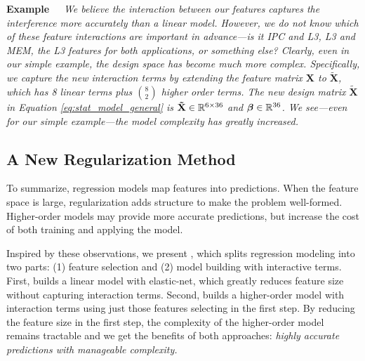 \noindent \textbf{Example~~}\textit{ We believe the interaction
  between our features captures the interference more accurately than
  a linear model.  However, we do not know which of these feature
  interactions are important in advance---\eg is it IPC and L3, L3 and
  MEM, the L3 features for both applications, or something else?
  Clearly, even in our simple example, the design space has become
  much more complex.  Specifically, we capture the new interaction
  terms by extending the feature matrix $\mathbf{X}$ to
  $\mathbf{\tilde{X}}$, which has 8 linear terms plus ${8 \choose 2}$
  higher order terms. The new design matrix $\mathbf{\tilde{X}}$ in
  Equation \eqref{eq:stat_model_general} is $\mathbf{\tilde{X}} \in
  \mathbb{R}^{6 \times 36}$ and $\boldsymbol{\beta} \in \mathbb{R}^{36}$. We
  see---even for our simple example---the model complexity has greatly
  increased.  }


\subsection{ A New Regularization Method}
\label{sec:est:system}
To summarize, regression models map features into predictions.  When
the feature space is large, regularization adds structure to make the
problem well-formed.  Higher-order models may provide more accurate
predictions, but increase the cost of both training and applying the
model.

Inspired by these observations, we present \SYSTEMESP{}, which splits
regression modeling into two parts: (1) feature selection and (2)
model building with interactive terms.  First, \SYSTEMESP{} builds a
linear model with elastic-net, which greatly reduces feature size
without capturing interaction terms.  Second, \SYSTEMESP{} builds a
higher-order model with interaction terms using just those features
selecting in the first step.  By reducing the feature size in the
first step, the complexity of the higher-order model remains tractable
and we get the benefits of both approaches: \emph{highly accurate
  predictions with manageable complexity.}


